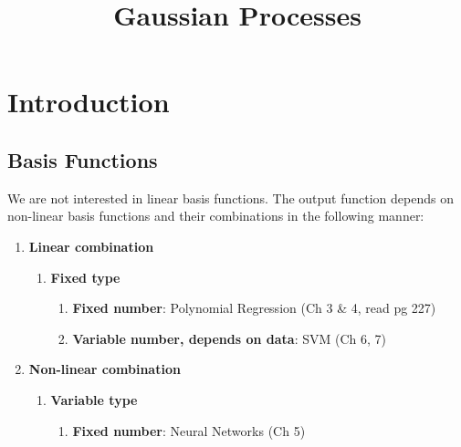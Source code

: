 \documentclass{article}
\title{Gaussian Processes}
\begin{document}
\maketitle

\section{Introduction}

\subsection{Basis Functions}
We are not interested in linear basis functions.
The output function depends on non-linear basis functions and their combinations in the following manner:

\begin{enumerate}
\item {\color{red}\textbf{Linear combination}}
\begin{enumerate}
\item {\color{OliveGreen}\textbf{Fixed type}}
\begin{enumerate}
\item {\color{blue}\textbf{Fixed number}}: Polynomial Regression (Ch 3 \& 4, read pg 227) 
\item {\color{blue}\textbf{Variable number, depends on data}}: SVM (Ch 6, 7)
\end{enumerate}
\end{enumerate}
\item {\color{red}\textbf{Non-linear combination}}
\begin{enumerate}
\item {\color{OliveGreen}\textbf{Variable type}}
\begin{enumerate}
\item {\color{blue}\textbf{Fixed number}}: Neural Networks (Ch 5)
\end{enumerate}
\end{enumerate}
\end{enumerate}

\cite{GaussProc_SimpleIntro}
\cite{BOOK_GMPL}

\printbibliography
\end{document}
